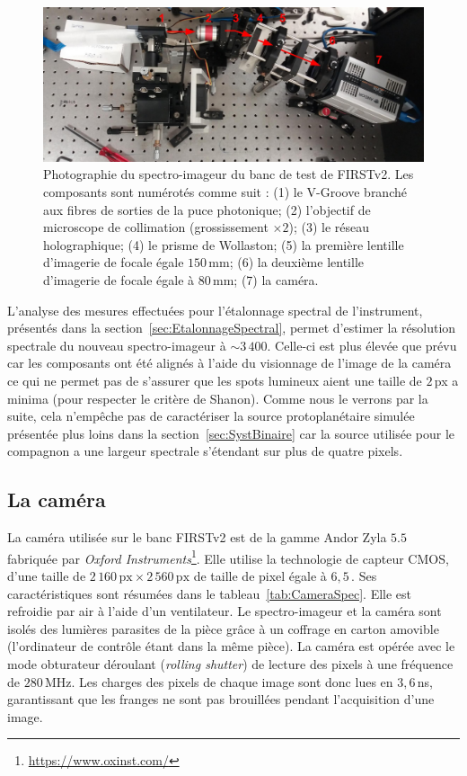 \begin{figure}[ht!]
    \centering
    \includegraphics[width=\figwidth]{Figure_Chap2/20210817_Spectro04.jpg}
    \caption[Photographie du spectro-imageur du banc de test de FIRSTv2.]{Photographie du spectro-imageur du banc de test de FIRSTv2. Les composants sont numérotés comme suit : (1) le V-Groove branché aux fibres de sorties de la puce photonique; (2) l'objectif de microscope de collimation (grossissement $\times 2$); (3) le réseau holographique; (4) le prisme de Wollaston; (5) la première lentille d'imagerie de focale égale $150 \,$mm; (6) la deuxième lentille d'imagerie de focale égale à $80 \,$mm; (7) la caméra.}
    \label{fig:SpectroPhoto}
\end{figure}

L'analyse des mesures effectuées pour l'étalonnage spectral de l'instrument, présentés dans la section~\ref{sec:EtalonnageSpectral}, permet d'estimer la résolution spectrale du nouveau spectro-imageur à $\sim 3\,400$. Celle-ci est plus élevée que prévu car les composants ont été alignés à l'aide du visionnage de l'image de la caméra ce qui ne permet pas de s'assurer que les spots lumineux aient une taille de $2 \,$px a minima (pour respecter le critère de Shanon). Comme nous le verrons par la suite, cela n'empêche pas de caractériser la source protoplanétaire simulée présentée plus loins dans la section~\ref{sec:SystBinaire} car la source utilisée pour le compagnon a une largeur spectrale s'étendant sur plus de quatre pixels.


\subsection{La caméra}
\label{sec:InstruCamera}

La caméra utilisée sur le banc \ac{FIRSTv2} est de la gamme Andor Zyla $5.5$ fabriquée par \textit{Oxford Instruments}\footnote{\url{https://www.oxinst.com/}}. Elle utilise la technologie de capteur \ac{CMOS}, d'une taille de $2\,160 \,\text{px} \times 2\,560 \,\text{px}$ de taille de pixel égale à $6,5 \,$\um. Ses caractéristiques sont résumées dans le tableau~\ref{tab:CameraSpec}. Elle est refroidie par air à l'aide d'un ventilateur. Le spectro-imageur et la caméra sont isolés des lumières parasites de la pièce grâce à un coffrage en carton amovible (l'ordinateur de contrôle étant dans la même pièce). La caméra est opérée avec le mode obturateur déroulant (\textit{rolling shutter}) de lecture des pixels à une fréquence de $280 \,$MHz. Les charges des pixels de chaque image sont donc lues en $3,6 \,$ns, garantissant que les franges ne sont pas brouillées pendant l'acquisition d'une image.

